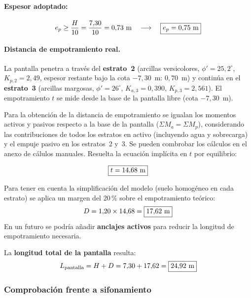\paragraph{Espesor adoptado:}
\[
  e_p \geq \frac{H}{10} = \frac{7{,}30}{10} = 0{,}73~\text{m}
  \quad\longrightarrow\quad \boxed{e_p = 0{,}75~\text{m}}
\]

\paragraph{Distancia de empotramiento real.}

La pantalla penetra a través del \textbf{estrato~2} (arcillas versicolores,
$\phi'=25{,}2^\circ$, $K_{p,2}=2{,}49$, espesor restante bajo la cota $-7{,}30$~m:
$0{,}70$~m) y continúa en el \textbf{estrato~3} (arcillas margosas,
$\phi'=26^\circ$, $K_{a,3}=0{,}390$, $K_{p,3}=2{,}561$). El empotramiento $t$ se
mide desde la base de la pantalla libre (cota $-7{,}30$~m).

Para la obtención de la distancia de empotramiento se igualan los momentos
activos y pasivos respecto a la base de la pantalla ($\Sigma M_a = \Sigma M_p$),
considerando las contribuciones de todos los estratos en activo (incluyendo
agua y sobrecarga) y el empuje pasivo en los estratos~2 y~3. Se pueden combrobar 
los cálculos en el anexo de cálulos manuales. Resuelta la
ecuación implícita en $t$ por equilibrio:

\begin{equation}
  \boxed{t = 14{,}68~\text{m}}
  \label{eq:empotramiento_pantalla}
\end{equation}

\begin{supuestobox}
  Para tener en cuenta la simplificación del modelo (suelo homogéneo en
  cada estrato) se aplica un margen del 20\,\% sobre el empotramiento
  teórico:
  \[
    D = 1{,}20 \times 14{,}68 = \boxed{17{,}62~\text{m}}
  \]
  En un futuro se podría añadir \textbf{anclajes activos} para reducir
  la longitud de empotramiento necesaria.
\end{supuestobox}

La \textbf{longitud total de la pantalla} resulta:
\begin{equation}
  L_\text{pantalla} = H + D = 7{,}30 + 17{,}62 = \boxed{24{,}92~\text{m}}
  \label{eq:long_pantalla}
\end{equation}

\subsubsection{Comprobación frente a sifonamiento}
\label{subsubsec:sifonamiento}


